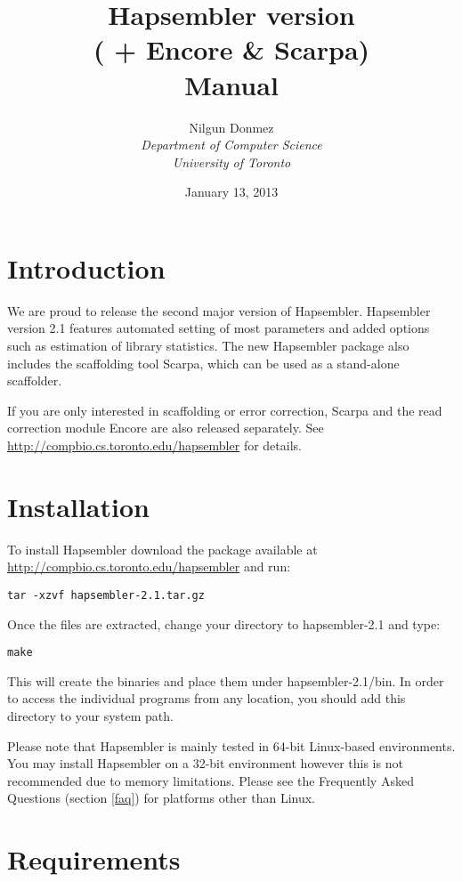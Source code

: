 \documentclass[12pt,a4paper]{report}
\title{Hapsembler version \hapversion{} \\ ( + Encore \& Scarpa) \\ Manual }
\author{Nilgun Donmez \\
\emph{Department of Computer Science} \\
\emph{University of Toronto} }
\date{January 13, 2013}
\newcommand{\hapversion}{2.1}
\begin{document}
\maketitle
\tableofcontents
\newpage

\renewcommand*\thesection{\arabic{section}}

\section{Introduction}

We are proud to release the second major version of Hapsembler. Hapsembler version \hapversion{} features automated setting of most parameters and added options such as estimation of library statistics. The new Hapsembler package also includes the scaffolding tool Scarpa, which can be used as a stand-alone scaffolder. 

If you are only interested in scaffolding or error correction, Scarpa and the read correction module Encore are also released separately. See \url{http://compbio.cs.toronto.edu/hapsembler} for details. 

\section{Installation}

To install Hapsembler download the package available at \url{http://compbio.cs.toronto.edu/hapsembler} and run:

\begin{verbatim}
tar -xzvf hapsembler-2.1.tar.gz
\end{verbatim}

Once the files are extracted, change your directory to hapsembler-\hapversion{} and type:

\begin{verbatim}
make
\end{verbatim}

This will create the binaries and place them under hapsembler-\hapversion{}/bin. In order to access the individual programs from any location, you should add this directory to your system path. 

Please note that Hapsembler is mainly tested in 64-bit Linux-based environments. You may install Hapsembler on a 32-bit environment however this is not recommended due to memory limitations. Please see the Frequently Asked Questions (section \ref{faq}) for platforms other than Linux.

\section{Requirements}
\end{document}

